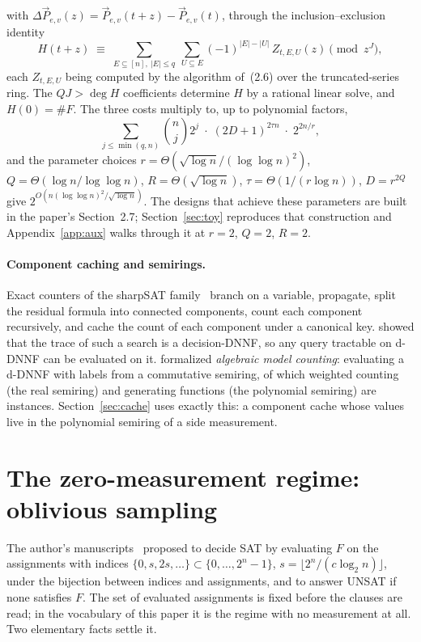 \documentclass[11pt]{article}
\theoremstyle{definition}
\theoremstyle{remark}
\newcommand{\F}{F}
\newcommand{\cnt}{\#F}
\begin{document}
with $\Delta \vec P_{e,v}(z) = \vec P_{e,v}(t + z) - \vec P_{e,v}(t)$, through the inclusion--exclusion identity
\begin{equation}\tag{2.9}
H(t + z) \;\equiv\; \sum_{E \subseteq [n],\ |E| \le q}\ \sum_{U \subseteq E} (-1)^{|E| - |U|}\, Z_{t,E,U}(z) \pmod{z^J},
\end{equation}
each $Z_{t,E,U}$ being computed by the algorithm of~(2.6) over the truncated-series ring. The $QJ > \deg H$ coefficients determine $H$ by a rational linear solve, and $H(0) = \cnt$. The three costs multiply to, up to polynomial factors,
\begin{equation}\tag{2.11}
\sum_{j \le \min(q,n)} \binom{n}{j} 2^j \;\cdot\; (2D+1)^{2\tau n} \;\cdot\; 2^{2n/r},
\end{equation}
and the parameter choices $r = \Theta(\sqrt{\log n}/(\log\log n)^2)$, $Q = \Theta(\log n / \log\log n)$, $R = \Theta(\sqrt{\log n})$, $\tau = \Theta(1/(r \log n))$, $D = r^{2Q}$ give $2^{O(n (\log\log n)^2/\sqrt{\log n})}$. The designs that achieve these parameters are built in the paper's Section~2.7; Section~\ref{sec:toy} reproduces that construction and Appendix~\ref{app:aux} walks through it at $r = 2$, $Q = 2$, $R = 2$.

\paragraph{Component caching and semirings.} Exact counters of the sharpSAT family~\citep{BP00,SBB04,Thu06,KJ21,SRSM19} branch on a variable, propagate, split the residual formula into connected components, count each component recursively, and cache the count of each component under a canonical key. \citet{HD05,HD07} showed that the trace of such a search is a decision-DNNF, so any query tractable on d-DNNF can be evaluated on it. \citet{KVD17} formalized \emph{algebraic model counting}: evaluating a d-DNNF with labels from a commutative semiring, of which weighted counting (the real semiring) and generating functions (the polynomial semiring) are instances. Section~\ref{sec:cache} uses exactly this: a component cache whose values live in the polynomial semiring of a side measurement.

\section{The zero-measurement regime: oblivious sampling}\label{sec:oblivious}

The author's manuscripts~\citep{McE24,McE25a,McE25b} proposed to decide SAT by evaluating $\F$ on the assignments with indices $\{0, s, 2s, \dots\} \subset \{0, \dots, 2^n - 1\}$, $s = \lfloor 2^n / (c \log_2 n) \rfloor$, under the bijection between indices and assignments, and to answer UNSAT if none satisfies $\F$. The set of evaluated assignments is fixed before the clauses are read; in the vocabulary of this paper it is the regime with no measurement at all. Two elementary facts settle it.
\end{document}

